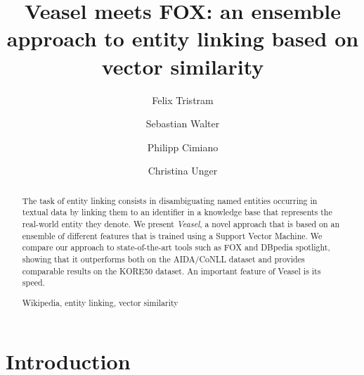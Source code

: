 \documentclass[runningheads,a4paper]{llncs}
\newcommand{\keywords}[1]{\par\addvspace\baselineskip
\noindent\keywordname\enspace\ignorespaces#1}
\begin{document}
\mainmatter  %

\newcommand{\acronym}{Veasel}



\title{Veasel meets FOX: an ensemble approach to entity linking based on vector similarity }

\author{Felix Tristram \and Sebastian Walter \and Philipp Cimiano  \and Christina Unger}



\maketitle


\begin{abstract}
The task of entity linking consists in disambiguating named entities occurring in textual data by linking them to an identifier in a knowledge base that represents the real-world entity they denote. We present \emph{Veasel}, a novel approach that is based on an ensemble of different features that is trained using a Support Vector Machine. We compare our approach to state-of-the-art tools such as FOX and DBpedia spotlight, showing that it outperforms both on the AIDA/CoNLL dataset and provides comparable results on the KORE50 dataset. An important feature of Veasel is its speed.

\keywords{Wikipedia, entity linking, vector similarity}
\end{abstract}

\section{Introduction}\label{sec:introduction}
\end{document}
